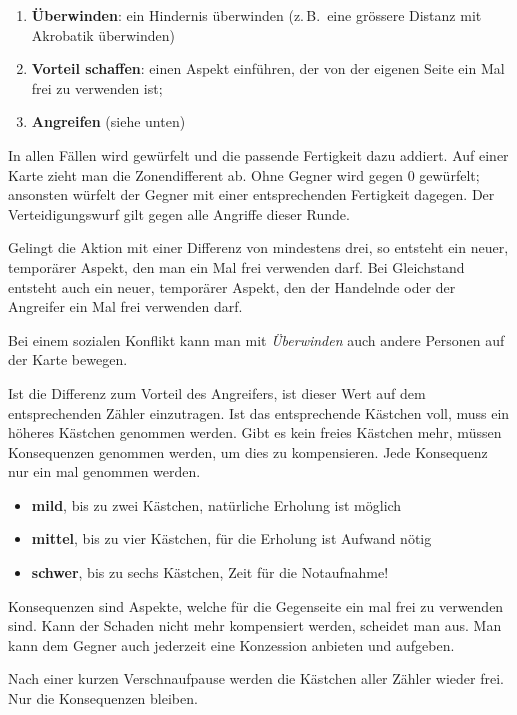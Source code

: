 \documentclass{tufte-handout}
\begin{document}
\begin{enumerate}
\item \textbf{Überwinden}: ein Hindernis überwinden (z.\,B.~eine
  grössere Distanz mit Akrobatik überwinden)
\item \textbf{Vorteil schaffen}: einen Aspekt einführen, der von der
  eigenen Seite ein Mal frei zu verwenden ist;
\item \textbf{Angreifen} (siehe unten)
\end{enumerate}

\noindent In allen Fällen wird gewürfelt und die passende Fertigkeit
dazu addiert. Auf einer Karte zieht man die Zonendifferent ab. Ohne
Gegner wird gegen 0 gewürfelt; ansonsten würfelt der Gegner mit einer
entsprechenden Fertigkeit dagegen. Der Verteidigungswurf gilt gegen
alle Angriffe dieser Runde.

Gelingt die Aktion mit einer Differenz von mindestens drei, so
entsteht ein neuer, temporärer Aspekt, den man ein Mal frei verwenden
darf. Bei Gleichstand entsteht auch ein neuer, temporärer Aspekt, den
der Handelnde oder der Angreifer ein Mal frei verwenden darf.

Bei einem sozialen Konflikt kann man mit \textit{Überwinden} auch
andere Personen auf der Karte bewegen. 

Ist die Differenz zum Vorteil des Angreifers, ist dieser Wert auf dem
entsprechenden Zähler einzutragen. Ist das entsprechende Kästchen
voll, muss ein höheres Kästchen genommen werden. Gibt es kein freies
Kästchen mehr, müssen Konsequenzen genommen werden, um dies zu
kompensieren. Jede Konsequenz nur ein mal genommen werden.

\begin{itemize}
\item \textbf{mild}, bis zu zwei Kästchen, natürliche Erholung ist
  möglich
\item \textbf{mittel}, bis zu vier Kästchen, für die Erholung ist
  Aufwand nötig
\item \textbf{schwer}, bis zu sechs Kästchen, Zeit für die
  Notaufnahme!
\end{itemize}

Konsequenzen sind Aspekte, welche für die Gegenseite ein mal frei zu
verwenden sind. Kann der Schaden nicht mehr kompensiert werden,
scheidet man aus. Man kann dem Gegner auch jederzeit eine Konzession
anbieten und aufgeben.

Nach einer kurzen Verschnaufpause werden die Kästchen aller Zähler
wieder frei. Nur die Konsequenzen bleiben.
\end{document}
